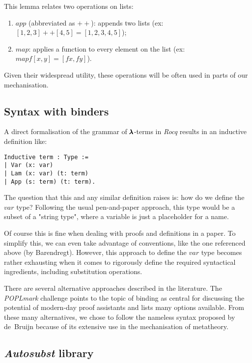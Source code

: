 This lemma relates two operations on lists:
\begin{enumerate}
\item \lst$app$ (abbreviated as \lst$++$): appends two lists (ex: \lst$[1,2,3]++[4,5] = [1,2,3,4,5]$);
\item \lst$map$: applies a function to every element on the list (ex: \lst$map f [x,y] = [f x, f y]$).
\end{enumerate}
Given their widespread utility, these operations will be often used in parts of our mechanisation.

\subsection{Syntax with binders}

A direct formalisation of the grammar of $\pmb{\lambda}$-terms in \textit{Rocq} results in an inductive definition like:
\begin{lstlisting}[language=Coq]
Inductive term : Type :=
| Var (x: var)
| Lam (x: var) (t: term)
| App (s: term) (t: term).
\end{lstlisting}

The question that this and any similar definition raises is: how do we define the \lst$var$ type? Following the usual pen-and-paper approach, this type would be a subset of a "string type", where a variable is just a placeholder for a name.

Of course this is fine when dealing with proofs and definitions in a paper.
To simplify this, we can even take advantage of conventions, like the one referenced above (by Barendregt).
However, this approach to define the \lst$var$ type becomes rather exhausting when it comes to rigorously define the required syntactical ingredients, including substitution operations.

There are several alternative approaches described in the literature.
The \textit{POPLmark} challenge \cite{POPLmark} points to the topic of binding as central for discussing the potential of modern-day proof assistants and lists many options available.
From these many alternatives, we chose to follow the nameless syntax proposed by de~Bruijn because of its extensive use in the mechanisation of metatheory.

\subsection{\textit{Autosubst} library}

